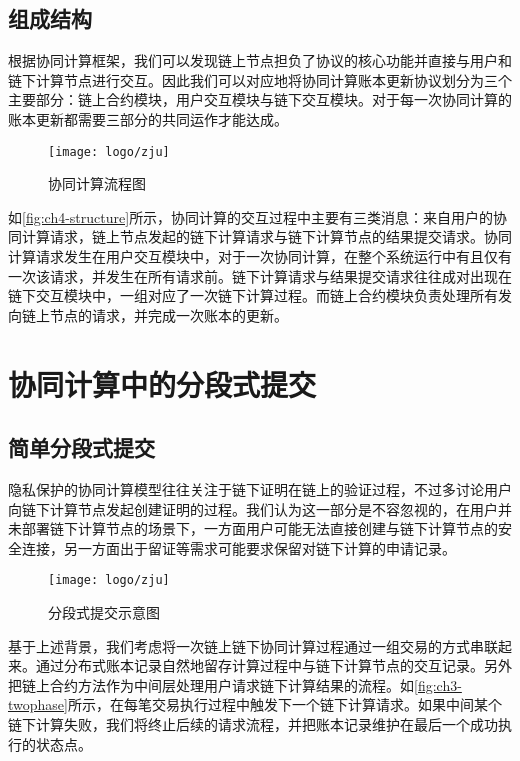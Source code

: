 \subsection{组成结构}
根据协同计算框架，我们可以发现链上节点担负了协议的核心功能并直接与用户和链下计算节点进行交互。因此我们可以对应地将协同计算账本更新协议划分为三个主要部分：链上合约模块，用户交互模块与链下交互模块。对于每一次协同计算的账本更新都需要三部分的共同运作才能达成。

\begin{figure}[htbp]
    \centering
    \texttt{[image: logo/zju]}
    \caption{\label{fig:ch4-structure}协同计算流程图}
\end{figure}

如\autoref{fig:ch4-structure}所示，协同计算的交互过程中主要有三类消息：来自用户的协同计算请求，链上节点发起的链下计算请求与链下计算节点的结果提交请求。协同计算请求发生在用户交互模块中，对于一次协同计算，在整个系统运行中有且仅有一次该请求，并发生在所有请求前。链下计算请求与结果提交请求往往成对出现在链下交互模块中，一组对应了一次链下计算过程。而链上合约模块负责处理所有发向链上节点的请求，并完成一次账本的更新。

\section{协同计算中的分段式提交}
\subsection{简单分段式提交}
隐私保护的协同计算模型往往关注于链下证明在链上的验证过程，不过多讨论用户向链下计算节点发起创建证明的过程。我们认为这一部分是不容忽视的，在用户并未部署链下计算节点的场景下，一方面用户可能无法直接创建与链下计算节点的安全连接，另一方面出于留证等需求可能要求保留对链下计算的申请记录。

\begin{figure}[htbp]
    \centering
    \texttt{[image: logo/zju]}
    \caption{\label{fig:ch3-twophase}分段式提交示意图}
\end{figure}

基于上述背景，我们考虑将一次链上链下协同计算过程通过一组交易的方式串联起来。通过分布式账本记录自然地留存计算过程中与链下计算节点的交互记录。另外把链上合约方法作为中间层处理用户请求链下计算结果的流程。如\autoref{fig:ch3-twophase}所示，在每笔交易执行过程中触发下一个链下计算请求。如果中间某个链下计算失败，我们将终止后续的请求流程，并把账本记录维护在最后一个成功执行的状态点。

